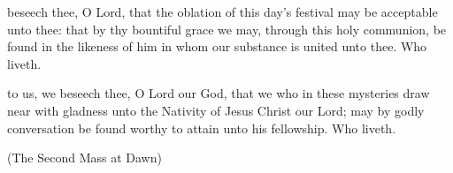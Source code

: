 \secret
{} beseech thee, O Lord, that the oblation of this day's festival may be acceptable unto thee: that by thy bountiful grace we may, through this holy communion, be found in the likeness of him in whom our substance is united unto thee. Who liveth.

\postcommunion
{} to us, we beseech thee, O Lord our God, that we who in these mysteries draw near with gladness unto the Nativity of Jesus Christ our Lord; may by godly conversation be found worthy to attain unto his fellowship. Who liveth.

\centerline{\small{(The Second Mass at Dawn)}}

